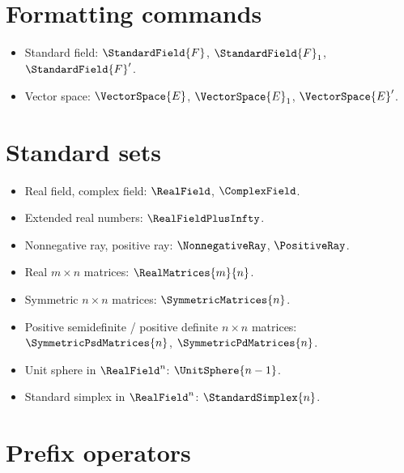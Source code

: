 \documentclass{article}
\begin{document}
  \section{Formatting commands}

  \begin{itemize}
    \item Standard field: $\StandardField{F}$, $\StandardField{F}_1$, $\StandardField{F}'$.
    \item Vector space: $\VectorSpace{E}$, $\VectorSpace{E}_1$, $\VectorSpace{E}'$.
  \end{itemize}

  \section{Standard sets}

  \begin{itemize}
    \item Real field, complex field: $\RealField$, $\ComplexField$.
    \item Extended real numbers: $\RealFieldPlusInfty$.
    \item Nonnegative ray, positive ray: $\NonnegativeRay$, $\PositiveRay$.
    \item Real $m \times n$ matrices: $\RealMatrices{m}{n}$.
    \item Symmetric $n \times n$ matrices: $\SymmetricMatrices{n}$.
    \item Positive semidefinite / positive definite $n \times n$ matrices: $\SymmetricPsdMatrices{n}$,
    $\SymmetricPdMatrices{n}$.
    \item Unit sphere in $\RealField^n$: $\UnitSphere{n - 1}$.
    \item Standard simplex in $\RealField^n$: $\StandardSimplex{n}$.
  \end{itemize}

  \section{Prefix operators}
\end{document}

